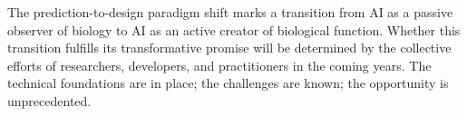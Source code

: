 \vspace{1em}
\noindent
The prediction-to-design paradigm shift marks a transition from AI as a passive observer of biology to AI as an active creator of biological function. Whether this transition fulfills its transformative promise will be determined by the collective efforts of researchers, developers, and practitioners in the coming years. The technical foundations are in place; the challenges are known; the opportunity is unprecedented.
